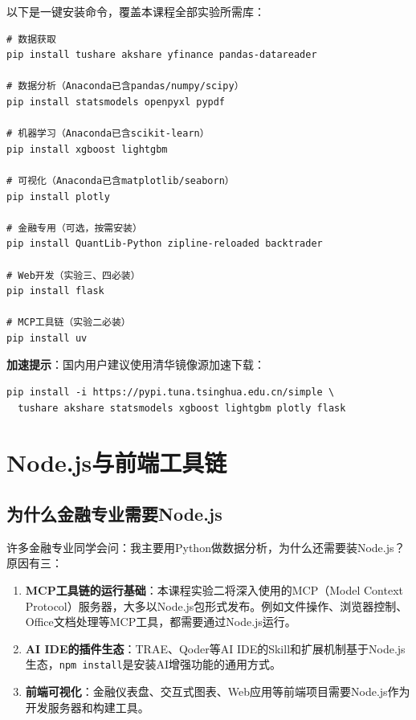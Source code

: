 \begin{practicebox}[金融专业推荐安装清单]
以下是一键安装命令，覆盖本课程全部实验所需库：

\begin{lstlisting}[style=shell]
# 数据获取
pip install tushare akshare yfinance pandas-datareader

# 数据分析（Anaconda已含pandas/numpy/scipy）
pip install statsmodels openpyxl pypdf

# 机器学习（Anaconda已含scikit-learn）
pip install xgboost lightgbm

# 可视化（Anaconda已含matplotlib/seaborn）
pip install plotly

# 金融专用（可选，按需安装）
pip install QuantLib-Python zipline-reloaded backtrader

# Web开发（实验三、四必装）
pip install flask

# MCP工具链（实验二必装）
pip install uv
\end{lstlisting}

\textbf{加速提示}：国内用户建议使用清华镜像源加速下载：
\begin{lstlisting}[style=shell]
pip install -i https://pypi.tuna.tsinghua.edu.cn/simple \
  tushare akshare statsmodels xgboost lightgbm plotly flask
\end{lstlisting}
\end{practicebox}

\section{Node.js与前端工具链}

\subsection{为什么金融专业需要Node.js}

许多金融专业同学会问：我主要用Python做数据分析，为什么还需要装Node.js？原因有三：

\begin{enumerate}[leftmargin=2em]
  \item \textbf{MCP工具链的运行基础}：本课程实验二将深入使用的MCP（Model Context Protocol）服务器，大多以Node.js包形式发布。例如文件操作、浏览器控制、Office文档处理等MCP工具，都需要通过Node.js运行。
  \item \textbf{AI IDE的插件生态}：TRAE、Qoder等AI IDE的Skill和扩展机制基于Node.js生态，\texttt{npm install}是安装AI增强功能的通用方式。
  \item \textbf{前端可视化}：金融仪表盘、交互式图表、Web应用等前端项目需要Node.js作为开发服务器和构建工具。
\end{enumerate}

